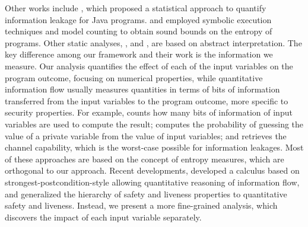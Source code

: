 Other works include , which proposed a statistical approach to quantify information leakage for Java programs.  and  employed symbolic execution techniques and model counting to obtain sound bounds on the entropy of programs.
Other static analyses, \eg,  and , are based on abstract interpretation.
%
%
The key difference among our framework and their work is the information we measure. Our analysis quantifies the effect of each of the input variables on the program outcome, focusing on numerical properties, while quantitative information flow usually measures quantities in terms of bits of information transferred from the input variables to the program outcome, more specific to security properties.
For example,  counts how many bits of information of input variables are used to compute the result;  computes the probability of guessing the value of a private variable from the value of input variables; and  retrieves the channel capability, which is the worst-case possible for information leakages. Most of these approaches are based on the concept of entropy measures, which are orthogonal to our approach.
Recent developments,  developed a calculus based on strongest-postcondition-style allowing quantitative reasoning of information flow, and  generalized the hierarchy of safety and liveness properties to quantitative safety and liveness.
Instead, we present a more fine-grained analysis, which discovers the impact of each input variable separately.


